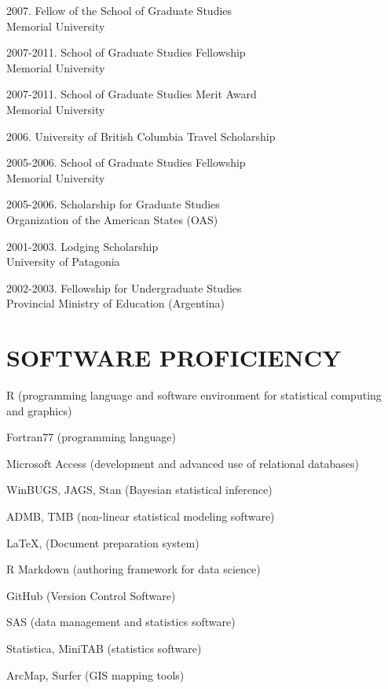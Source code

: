 \documentclass{res}
\begin{document}
\begin{resume}
\begin{hangparas}{.4in}{1}
2007. Fellow of the School of Graduate Studies\\
Memorial University

2007-2011. 
School of Graduate Studies Fellowship \\
Memorial University

2007-2011. School of Graduate Studies Merit Award\\
Memorial University

2006. University of British Columbia Travel Scholarship

2005-2006. School of Graduate Studies Fellowship\\
Memorial University

2005-2006. Scholarship for Graduate Studies\\
Organization of the American States (OAS)

2001-2003. Lodging Scholarship\\
University of Patagonia

2002-2003. Fellowship for Undergraduate Studies\\
Provincial Ministry of Education (Argentina)

\end{hangparas}


\section{SOFTWARE PROFICIENCY}
\vspace{0.2in} 

R (programming language and software environment for statistical computing and graphics)

Fortran77 (programming language)

Microsoft Access (development and advanced use of relational databases)

WinBUGS, JAGS, Stan (Bayesian statistical inference)

ADMB, TMB (non-linear statistical modeling software)

\LaTeX,  (Document preparation system)

R Markdown (authoring framework for data science)

GitHub (Version Control Software)

SAS (data management and statistics software)

Statistica, MiniTAB (statistics software)

ArcMap, Surfer (GIS mapping tools)




\end{resume}
\end{document}
